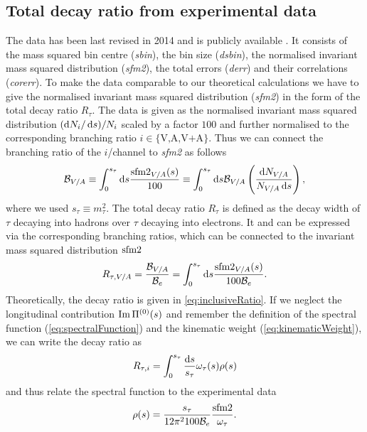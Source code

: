 \documentclass[../../index.tex]{subfiles}
\begin{document}
\subsection{Total decay ratio from experimental data}
The data has been last revised in 2014 \cite{Davier2013} and is publicly
available \cite{AlephData}. It consists of the mass squared bin centre
(\textit{sbin}), the bin size (\textit{dsbin}), the normalised invariant mass
squared distribution (\textit{sfm2}), the total errors (\textit{derr}) and their
correlations (\textit{corerr}). To make the data comparable to our theoretical
calculations we have to give the normalised invariant mass squared distribution
(\textit{sfm2}) in the form of the total decay ratio \(R_\tau\). The data is given
as the normalised invariant mass squared distribution \((\dif N_i/\dif s)/N_i\)
scaled by a factor \(100\) and further normalised to the corresponding branching
ratio \(i\in\{\text{V,A,V+A}\}\). Thus we can connect the branching ratio of the
\(i\)\-/channel to \textit{sfm2} as follows
\begin{equation}
  \mathcal{B}_{V/A} \equiv \int_0^{s_\tau} \dif s \frac{\sfm2_{V/A}(s)}{100}
  \equiv \int_0^{s_\tau} \dif s \mathcal{B}_{V/A}
  \left( \frac{\dif N_{V/A}}{N_{V/A}\dif s} \right),
\end{equation}
where we used \(s_\tau \equiv m_\tau^2\). The total decay ratio \(R_\tau\) is
defined as the decay width of \(\tau\) decaying into hadrons over \(\tau\)
decaying into electrons. It and can be expressed via the corresponding branching
ratios, which can be connected to the invariant mass squared distribution
\(\sfm2\)
\begin{equation}
  R_{\tau, V/A} = \frac{\mathcal{B}_{V/A}}{\mathcal{B}_e}
  = \int_0^{s_\tau} \dif s \frac{\sfm2_{V/A}(s)}{100 \mathcal{B}_e}.
\end{equation}
Theoretically, the decay ratio is given in \cref{eq:inclusiveRatio}. If we
neglect the longitudinal contribution \(\operatorname{Im} \Pi^{(0)}(s)\) and remember the
definition of the spectral function (\cref{eq:spectralFunction}) and the
kinematic weight (\cref{eq:kinematicWeight}), we can write the decay ratio as
\begin{equation}
  R_{\tau, i} = \int_0^{s_\tau} \frac{\dif s}{s_\tau} \omega_\tau(s) \rho(s)
\end{equation}
and thus relate the spectral function to the experimental data
\begin{equation}
  \rho(s) = \frac{s_\tau}{12 \pi^2 100 \mathcal{B}_e} \frac{\sfm2}{\omega_\tau}.
\end{equation}
\end{document}
